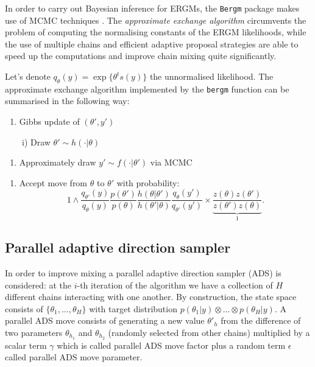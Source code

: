\documentclass[]{book}
\providecommand{\tightlist}{%
  \setlength{\itemsep}{0pt}\setlength{\parskip}{0pt}}
\begin{document}
In order to carry out Bayesian inference for ERGMs, the \texttt{Bergm}
package makes use of MCMC techniques \citep{cai:fri11}. The
\emph{approximate exchange algorithm} circumvents the problem of
computing the normalising constants of the ERGM likelihoods, while the
use of multiple chains and efficient adaptive proposal strategies are
able to speed up the computations and improve chain mixing quite
significantly.

Let's denote \(q_{\theta}(y) = \exp \{ \theta^t s(y) \}\) the
unnormalised likelihood. The approximate exchange algorithm implemented
by the \texttt{bergm} function can be summarised in the following way:

\begin{enumerate}
\def\labelenumi{\arabic{enumi}.}
\tightlist
\item
  Gibbs update of \((\theta',y')\)
\end{enumerate}

\(\qquad\)i) Draw \(\theta' \sim h(\cdot|\theta)\)

\begin{enumerate}
\def\labelenumi{\roman{enumi})}
\setcounter{enumi}{1}
\tightlist
\item
  Approximately draw \(y' \sim f(\cdot|\theta')\) via MCMC
\end{enumerate}

\begin{enumerate}
\def\labelenumi{\arabic{enumi}.}
\setcounter{enumi}{1}
\tightlist
\item
  Accept move from \(\theta\) to \(\theta'\) with probability: \[
          1 \wedge \frac{q_{\theta'}(y)}{q_{\theta}(y)}
          \frac{p(\theta')}{p(\theta)} 
          \frac{h(\theta|\theta')}{h(\theta'|\theta)}
          \frac{q_{\theta}(y')}{q_{\theta'}(y')} 
          \times \underbrace{\frac{z(\theta)z(\theta')}{z(\theta')z(\theta)}}_{1}.
          \]
\end{enumerate}

\subsection{Parallel adaptive direction
sampler}\label{parallel-adaptive-direction-sampler}

In order to improve mixing a parallel adaptive direction sampler (ADS)
\citep{gil:rob:geo94, rob:gil94} is considered: at the \(i\)-th
iteration of the algorithm we have a collection of \(H\) different
chains interacting with one another. By construction, the state space
consists of \(\{\theta_1,\dots,\theta_H\}\) with target distribution
\(p(\theta_1|y)\otimes\dots\otimes p(\theta_H | y)\). A parallel ADS
move consists of generating a new value \(\theta'_h\) from the
difference of two parameters \(\theta_{h_1}\) and \(\theta_{h_2}\)
(randomly selected from other chains) multiplied by a scalar term
\(\gamma\) which is called parallel ADS move factor plus a random term
\(\epsilon\) called parallel ADS move parameter.
\end{document}
